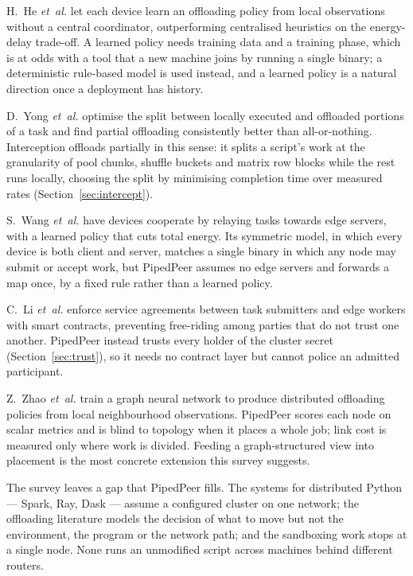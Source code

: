 H.~He \textit{et~al.} \cite{he2024} let each device learn an offloading policy
from local observations without a central coordinator, outperforming centralised
heuristics on the energy-delay trade-off. A learned policy needs training data
and a training phase, which is at odds with a tool that a new machine joins by
running a single binary; a deterministic rule-based model is used instead, and a
learned policy is a natural direction once a deployment has history.

D.~Yong \textit{et~al.} \cite{yong2023} optimise the split between locally
executed and offloaded portions of a task and find partial offloading
consistently better than all-or-nothing. Interception offloads partially in this
sense: it splits a script's work at the granularity of pool chunks, shuffle
buckets and matrix row blocks while the rest runs locally, choosing the split
by minimising completion time over measured rates (Section~\ref{sec:intercept}).

S.~Wang \textit{et~al.} \cite{adhoc2025} have devices cooperate by relaying tasks towards edge
servers, with a learned policy that cuts total energy. Its symmetric model, in
which every device is both client and server, matches a single binary in which
any node may submit or accept work, but PipedPeer assumes no edge servers and
forwards a map once, by a fixed rule rather than a learned policy.

C.~Li
\textit{et~al.} \cite{li2023blockchain} enforce service agreements between task submitters and edge
workers with smart contracts, preventing free-riding among parties that do not
trust one another. PipedPeer instead trusts every holder of the cluster
secret (Section~\ref{sec:trust}), so it needs no contract layer but cannot
police an admitted participant.

Z.~Zhao \textit{et~al.} \cite{zhao2023} train a graph neural network to produce
distributed offloading policies from local neighbourhood observations. PipedPeer
scores each node on scalar metrics and is blind to topology when it places a
whole job; link cost is measured only where work is divided. Feeding a
graph-structured view into placement is the most concrete extension this survey
suggests.

The survey leaves a gap that PipedPeer fills. The systems for distributed Python
--- Spark, Ray, Dask --- assume a configured cluster on one network; the
offloading literature models the decision of what to move but not the
environment, the program or the network path; and the sandboxing work stops at a
single node. None runs an unmodified script across machines behind different
routers.

